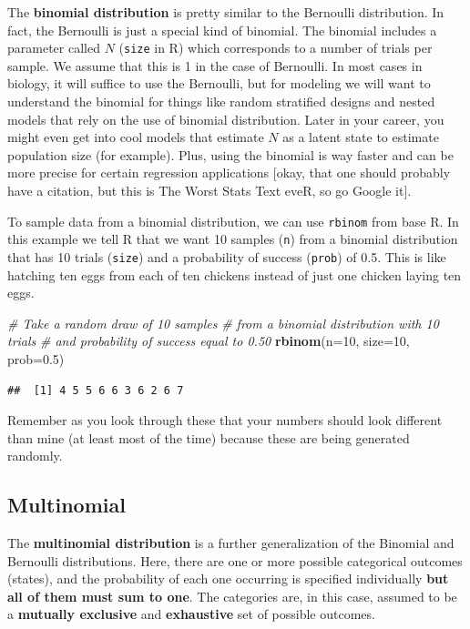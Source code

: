 \documentclass[
]{book}
\newenvironment{Shaded}{\begin{snugshade}}{\end{snugshade}}
\newcommand{\CommentTok}[1]{\textcolor[rgb]{0.56,0.35,0.01}{\textit{#1}}}
\newcommand{\DataTypeTok}[1]{\textcolor[rgb]{0.13,0.29,0.53}{#1}}
\newcommand{\DecValTok}[1]{\textcolor[rgb]{0.00,0.00,0.81}{#1}}
\newcommand{\FloatTok}[1]{\textcolor[rgb]{0.00,0.00,0.81}{#1}}
\newcommand{\KeywordTok}[1]{\textcolor[rgb]{0.13,0.29,0.53}{\textbf{#1}}}
\newcommand{\NormalTok}[1]{#1}
\begin{document}
The \textbf{binomial distribution} is pretty similar to the Bernoulli distribution. In fact, the Bernoulli is just a special kind of binomial. The binomial includes a parameter called \(N\) (\texttt{size} in R) which corresponds to a number of trials per sample. We assume that this is 1 in the case of Bernoulli. In most cases in biology, it will suffice to use the Bernoulli, but for modeling we will want to understand the binomial for things like random stratified designs and nested models that rely on the use of binomial distribution. Later in your career, you might even get into cool models that estimate \(N\) as a latent state to estimate population size (for example). Plus, using the binomial is way faster and can be more precise for certain regression applications {[}okay, that one should probably have a citation, but this is The Worst Stats Text eveR, so go Google it{]}.

To sample data from a binomial distribution, we can use \texttt{rbinom} from base R. In this example we tell R that we want 10 samples (\texttt{n}) from a binomial distribution that has 10 trials (\texttt{size}) and a probability of success (\texttt{prob}) of 0.5. This is like hatching ten eggs from each of ten chickens instead of just one chicken laying ten eggs.

\begin{Shaded}
\begin{Highlighting}[]
\CommentTok{# Take a random draw of 10 samples}
\CommentTok{# from a binomial distribution with 10 trials}
\CommentTok{# and probability of success equal to 0.50}
\KeywordTok{rbinom}\NormalTok{(}\DataTypeTok{n=}\DecValTok{10}\NormalTok{, }\DataTypeTok{size=}\DecValTok{10}\NormalTok{, }\DataTypeTok{prob=}\FloatTok{0.5}\NormalTok{)}
\end{Highlighting}
\end{Shaded}

\begin{verbatim}
##  [1] 4 5 5 6 6 3 6 2 6 7
\end{verbatim}

Remember as you look through these that your numbers should look different than mine (at least most of the time) because these are being generated randomly.

\hypertarget{multinomial}{%
\subsection{Multinomial}\label{multinomial}}

The \textbf{multinomial distribution} is a further generalization of the Binomial and Bernoulli distributions. Here, there are one or more possible categorical outcomes (states), and the probability of each one occurring is specified individually \textbf{but all of them must sum to one}. The categories are, in this case, assumed to be a \textbf{mutually exclusive} and \textbf{exhaustive} set of possible outcomes.
\end{document}
